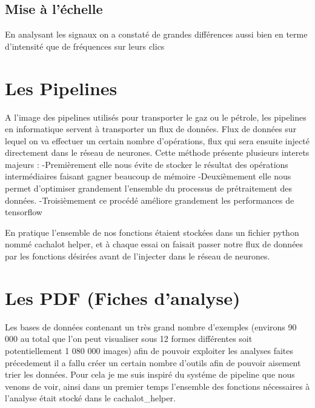\hypertarget{Mise-a-l-echelle}{%
\subsection{Mise à l'échelle}
\label{Mise-a-l-echelle}}

En analysant les signaux on a constaté de grandes différences aussi bien en terme d'intensité que de fréquences sur leurs clics 

\hypertarget{Les-Pipelines}{%
\section{Les Pipelines}
\label{Les-Pipelines}}

A l'image des pipelines utilisés pour transporter le gaz ou le pétrole, les pipelines en informatique servent à transporter un flux de données.
Flux de données sur lequel on va effectuer un certain nombre d'opérations, flux qui sera ensuite injecté directement dans le réseau de neurones.
Cette méthode présente plusieurs interets majeurs :
-Premièrement elle nous évite de stocker le résultat des opérations intermédiaires  faisant gagner beaucoup de mémoire
-Deuxièmement elle nous permet d'optimiser grandement l'ensemble du processus de prétraitement des données.
-Troisièmement ce procédé améliore grandement les performances de tensorflow

En pratique l'ensemble de nos fonctions étaient stockées dans un fichier python nommé cachalot helper, et à chaque essai on faisait passer notre flux de données par les fonctions désirées avant de l'injecter dans le réseau de neurones.


\hypertarget{Les-PDF}{%
\section{Les PDF (Fiches d'analyse)}
\label{Les-PDF}}

Les bases de données contenant un très grand nombre d'exemples (environs 90 000 au total que l'on peut visualiser sous 12 formes différentes soit potentiellement 1 080 000 images) afin de pouvoir exploiter les analyses faites précedement il a fallu créer un certain nombre d'outils afin de pouvoir aisement trier les données.
Pour cela je me suis inspiré du systéme de pipeline que nous venons de voir, ainsi dans un premier temps l'ensemble des fonctions nécessaires à l'analyse était stocké dans le cachalot{\_}helper.

